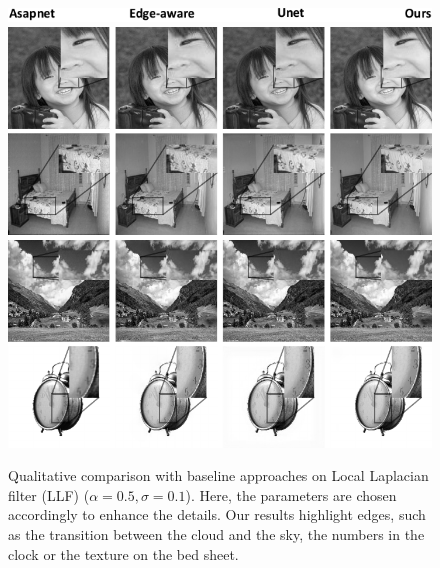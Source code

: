 
\begin{figure}%
  \centering
    \includegraphics[width=.82\linewidth]{Chapters/detail-retouching-figs/One-shot-labels.pdf}
  \includegraphics[width=\linewidth]{Chapters/detail-retouching-figs/Qualitative_zoomed_LLF_a05_s01.pdf}
    \caption{Qualitative comparison with baseline approaches on Local Laplacian filter (LLF) ($\alpha=0.5, \sigma=0.1$). Here, the parameters are chosen accordingly to enhance the details. Our results highlight edges, such as the transition between the cloud and the sky, the numbers in the clock or the texture on the bed sheet.} 

   \label{fig:QualitativeComp_LLF_a05}%
\end{figure}

\newpage
